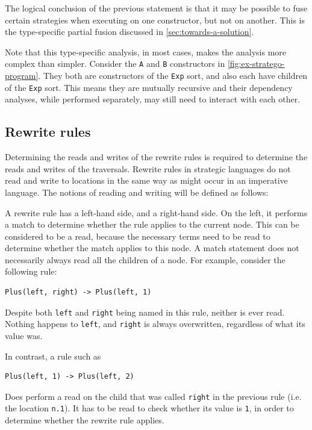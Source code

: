 The logical conclusion of the previous statement is that it may be possible to fuse certain strategies when executing on one constructor, but not on another. This is the type-specific partial fusion discussed in \autoref{sec:towards-a-solution}.

Note that this type-specific analysis, in most cases, makes the analysis more complex than simpler. Consider the \texttt{A} and \texttt{B} constructors in \autoref{fig:ex-stratego-program}. They both are constructors of the \texttt{Exp} sort, and also each have children of the \texttt{Exp} sort. This means they are mutually recursive and their dependency analyses, while performed separately, may still need to interact with each other.

\subsection{Rewrite rules}
Determining the reads and writes of the rewrite rules is required to determine the reads and writes of the traversals. Rewrite rules in strategic languages do not read and write to locations in the same way as might occur in an imperative language. The notions of reading and writing will be defined as follows:

A rewrite rule has a left-hand side, and a right-hand side. On the left, it performs a match to determine whether the rule applies to the current node. This can be considered to be a read, because the necessary terms need to be read to determine whether the match applies to this node. A match statement does not necessarily always read all the children of a node. For example, consider the following rule:

\begin{lstlisting}[style = mystyle_ex_stratego_program]
    Plus(left, right) -> Plus(left, 1)
\end{lstlisting}

Despite both \texttt{left} and \texttt{right} being named in this rule, neither is ever read. Nothing happens to \texttt{left}, and \texttt{right} is always overwritten, regardless of what its value was.

In contrast, a rule such as
\begin{lstlisting}[style = mystyle_ex_stratego_program]
    Plus(left, 1) -> Plus(left, 2)
\end{lstlisting}

Does perform a read on the child that was called \texttt{right} in the previous rule (i.e. the location \texttt{n.1}). It has to be read to check whether its value is \texttt{1}, in order to determine whether the rewrite rule applies.

